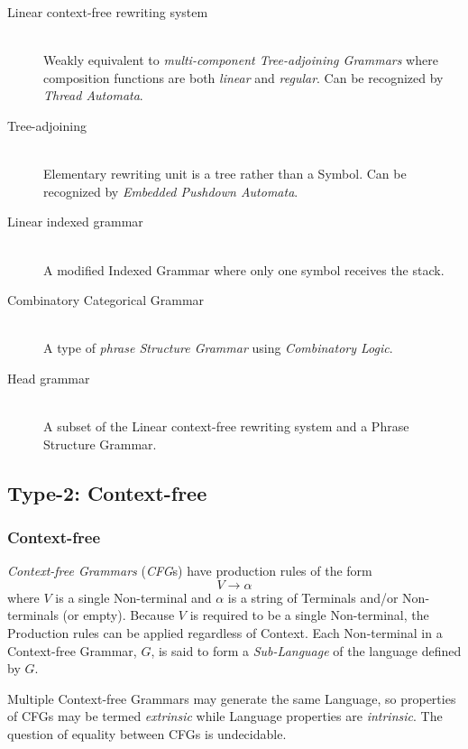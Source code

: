 \documentclass{article}
\begin{document}
\begin{description}
\item[Linear context-free rewriting system] \hfill \\
    Weakly equivalent to \emph{multi-component Tree-adjoining
      Grammars} where composition functions are both \emph{linear} and
    \emph{regular}. Can be recognized by \emph{Thread
      Automata}\cite{villemonte02}.

\item[Tree-adjoining] \hfill \\
    Elementary rewriting unit is a tree rather than a Symbol. Can be
    recognized by \emph{Embedded Pushdown
      Automata}\cite{vijayashanker88}.

\item[Linear indexed grammar] \hfill \\
    A modified Indexed Grammar where only one symbol receives the
    stack.

\item[Combinatory Categorical Grammar] \hfill \\
    A type of \emph{phrase Structure Grammar} using \emph{Combinatory
      Logic}.

\item[Head grammar] \hfill \\
    A subset of the Linear context-free rewriting system and a Phrase
    Structure Grammar.

\end{description}

\subsection{Type-2: Context-free}\label{subsec:context_free_language}

\subsubsection{Context-free}
\emph{Context-free Grammars} (\emph{CFG}s) have production rules of the form
\[
    V \rightarrow \alpha
\]
where $V$ is a single Non-terminal and $\alpha$ is a string of Terminals
and/or Non-terminals (or empty). Because $V$ is required to be a
single Non-terminal, the Production rules can be applied regardless of
Context. Each Non-terminal in a Context-free Grammar, $G$, is said to
form a \emph{Sub-Language} of the language defined by $G$.

Multiple Context-free Grammars may generate the same Language, so
properties of CFGs may be termed \emph{extrinsic} while Language properties
are \emph{intrinsic}. The question of equality between CFGs is
undecidable.
\end{document}
